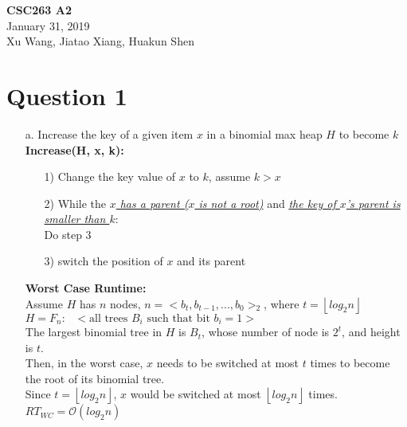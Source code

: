 \documentclass[10pt]{article}
\begin{document}
\noindent \textbf{CSC263 A2}\\
January 31, 2019\\
Xu Wang, Jiatao Xiang, Huakun Shen
\section*{Question 1}
\begin{enumerate}
\item[a.] Increase the key of a given item $x$ in a binomial max heap $H$ to
become $k$\\
\textbf{Increase(H, x, k):}
\begin{enumerate}
\item[1)]Change the key value of $x$ to $k$, assume $k>x$
\item[2)]While the \underline{\textit{$x$ has a parent ($x$ is not a root)}} and \underline{\textit{the key of $x$'s parent is smaller than $k$}}:\\
Do step 3
\item[3)]switch the position of $x$ and its parent
\end{enumerate}
\textbf{Worst Case Runtime:}\\
Assume $H$ has $n$ nodes, $n=<b_t,b_{t-1},...,b_0>_2$,		where $t=\left\lfloor log_2n\right\rfloor$\\
$H=F_n:\text{ }<\text{all trees } B_i \text{ such that bit }b_i = 1>$\\
The largest binomial tree in $H$ is $B_t$, whose number of node is $2^t$, and height is $t$.\\
Then, in the worst case, $x$ needs to be switched at most $t$ times to become the root of its binomial tree.\\
Since $t=\left\lfloor log_2n\right\rfloor$, $x$ would be switched at most $\left\lfloor log_2n\right\rfloor$ times.\\
$RT_{WC}=\mathcal{O}(log_2n)$




\end{enumerate}
\end{document}
